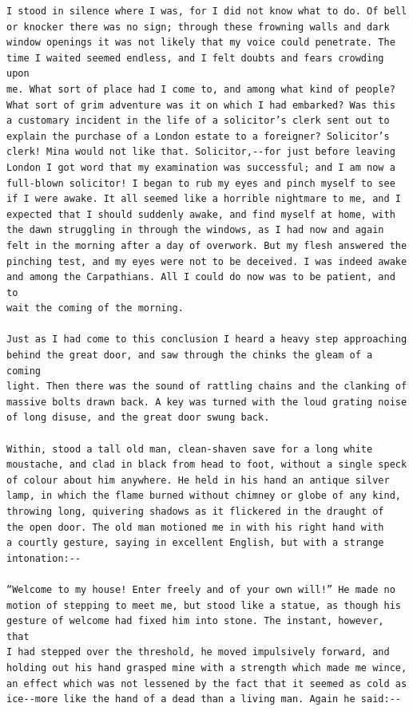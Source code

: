 \documentclass{article}
\begin{document}
\begin{verbatim}
I stood in silence where I was, for I did not know what to do. Of bell
or knocker there was no sign; through these frowning walls and dark
window openings it was not likely that my voice could penetrate. The
time I waited seemed endless, and I felt doubts and fears crowding upon
me. What sort of place had I come to, and among what kind of people?
What sort of grim adventure was it on which I had embarked? Was this
a customary incident in the life of a solicitor’s clerk sent out to
explain the purchase of a London estate to a foreigner? Solicitor’s
clerk! Mina would not like that. Solicitor,--for just before leaving
London I got word that my examination was successful; and I am now a
full-blown solicitor! I began to rub my eyes and pinch myself to see
if I were awake. It all seemed like a horrible nightmare to me, and I
expected that I should suddenly awake, and find myself at home, with
the dawn struggling in through the windows, as I had now and again
felt in the morning after a day of overwork. But my flesh answered the
pinching test, and my eyes were not to be deceived. I was indeed awake
and among the Carpathians. All I could do now was to be patient, and to
wait the coming of the morning.

Just as I had come to this conclusion I heard a heavy step approaching
behind the great door, and saw through the chinks the gleam of a coming
light. Then there was the sound of rattling chains and the clanking of
massive bolts drawn back. A key was turned with the loud grating noise
of long disuse, and the great door swung back.

Within, stood a tall old man, clean-shaven save for a long white
moustache, and clad in black from head to foot, without a single speck
of colour about him anywhere. He held in his hand an antique silver
lamp, in which the flame burned without chimney or globe of any kind,
throwing long, quivering shadows as it flickered in the draught of
the open door. The old man motioned me in with his right hand with
a courtly gesture, saying in excellent English, but with a strange
intonation:--

“Welcome to my house! Enter freely and of your own will!” He made no
motion of stepping to meet me, but stood like a statue, as though his
gesture of welcome had fixed him into stone. The instant, however, that
I had stepped over the threshold, he moved impulsively forward, and
holding out his hand grasped mine with a strength which made me wince,
an effect which was not lessened by the fact that it seemed as cold as
ice--more like the hand of a dead than a living man. Again he said:--


\end{verbatim}
\end{document}
